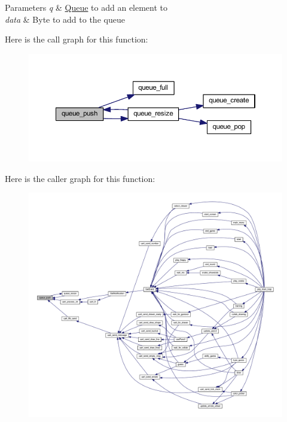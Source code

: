\begin{DoxyParams}{Parameters}
{\em q} & \mbox{\hyperlink{struct_queue}{Queue}} to add an element to \\
\hline
{\em data} & Byte to add to the queue \\
\hline
\end{DoxyParams}
Here is the call graph for this function\+:\nopagebreak
\begin{figure}[H]
\begin{center}
\leavevmode
\includegraphics[width=350pt]{group__queue_ga056bdcedf660416247cdb05759766702_cgraph}
\end{center}
\end{figure}
Here is the caller graph for this function\+:\nopagebreak
\begin{figure}[H]
\begin{center}
\leavevmode
\includegraphics[width=350pt]{group__queue_ga056bdcedf660416247cdb05759766702_icgraph}
\end{center}
\end{figure}
\mbox{\label{group__queue_ga017ba4cb33cd9d231b0071fa8d9190cc}} 
